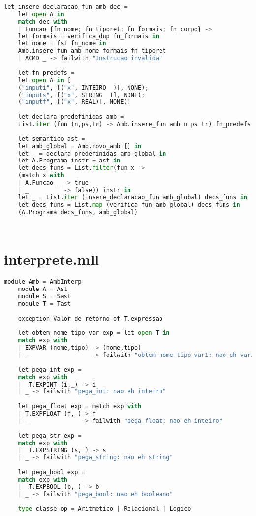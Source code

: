 \documentclass[hidelinks,12pt]{article}
\begin{document}
\begin{appendices}
\begin{lstlisting}[caption=semantico.mll, language=python]
	let insere_declaracao_fun amb dec =
	let open A in
	match dec with
	| Funcao {fn_nome; fn_tiporet; fn_formais; fn_corpo} ->
	let formais = verifica_dup fn_formais in
	let nome = fst fn_nome in
	Amb.insere_fun amb nome formais fn_tiporet
	| ACMD _ -> failwith "Instrucao invalida"
	
	let fn_predefs = 
	let open A in [
	("inputi", [("x", INTEIRO  )], NONE);
	("inputs", [("x", STRING  )], NONE);
	("inputf", [("x", REAL)], NONE)]
	
	let declara_predefinidas amb =
	List.iter (fun (n,ps,tr) -> Amb.insere_fun amb n ps tr) fn_predefs
	
	let semantico ast =
	let amb_global = Amb.novo_amb [] in
	let _ = declara_predefinidas amb_global in
	let A.Programa instr = ast in
	let decs_funs = List.filter(fun x -> 
	(match x with
	| A.Funcao _ -> true
	| _          -> false)) instr in
	let _ = List.iter (insere_declaracao_fun amb_global) decs_funs in
	let decs_funs = List.map (verifica_fun amb_global) decs_funs in
	(A.Programa decs_funs, amb_global)
	
	
	\end{lstlisting}
	
	\newpage
	\chapter{interprete.mll}
	
	\begin{lstlisting}[caption=interprete.mll, language=python]
	module Amb = AmbInterp
	module A = Ast
	module S = Sast
	module T = Tast
	
	exception Valor_de_retorno of T.expressao
	
	let obtem_nome_tipo_var exp = let open T in
	match exp with
	| EXPVAR (nome,tipo) -> (nome,tipo)
	| _                  -> failwith "obtem_nome_tipo_var1: nao eh variavel"
	
	let pega_int exp =
	match exp with
	|  T.EXPINT (i,_) -> i
	| _ -> failwith "pega_int: nao eh inteiro"
	
	let pega_float exp = match exp with
	| T.EXPFLOAT (f,_)-> f
	| _               -> failwith "pega_float: nao eh inteiro"
	
	let pega_str exp =
	match exp with
	|  T.EXPSTRING (s,_) -> s
	| _ -> failwith "pega_string: nao eh string"
	
	let pega_bool exp =
	match exp with
	|  T.EXPBOOL (b,_) -> b
	| _ -> failwith "pega_bool: nao eh booleano"
	
	type classe_op = Aritmetico | Relacional | Logico 
	

\end{lstlisting}
\end{appendices}
\end{document}
